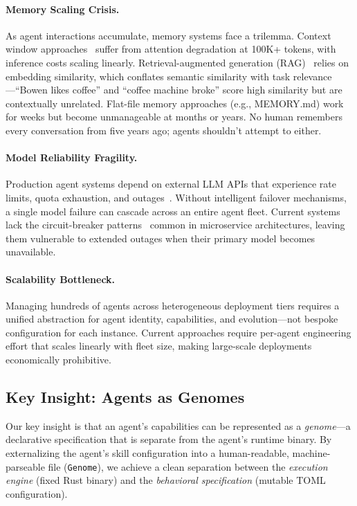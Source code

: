 \documentclass[conference]{IEEEtran}
\newcommand{\genome}{\texttt{Genome}\xspace}
\begin{document}
\paragraph{Memory Scaling Crisis.} As agent interactions accumulate, memory systems face a trilemma. Context window approaches~\cite{xiong2023memorizing} suffer from attention degradation at 100K+ tokens, with inference costs scaling linearly. Retrieval-augmented generation (RAG)~\cite{lewis2020retrieval} relies on embedding similarity, which conflates semantic similarity with task relevance—``Bowen likes coffee'' and ``coffee machine broke'' score high similarity but are contextually unrelated. Flat-file memory approaches (e.g., MEMORY.md) work for weeks but become unmanageable at months or years. No human remembers every conversation from five years ago; agents shouldn't attempt to either.

\paragraph{Model Reliability Fragility.} Production agent systems depend on external LLM APIs that experience rate limits, quota exhaustion, and outages~\cite{tan2020head}. Without intelligent failover mechanisms, a single model failure can cascade across an entire agent fleet. Current systems lack the circuit-breaker patterns~\cite{ford2000circuit} common in microservice architectures, leaving them vulnerable to extended outages when their primary model becomes unavailable.

\paragraph{Scalability Bottleneck.} Managing hundreds of agents across heterogeneous deployment tiers requires a unified abstraction for agent identity, capabilities, and evolution—not bespoke configuration for each instance. Current approaches require per-agent engineering effort that scales linearly with fleet size, making large-scale deployments economically prohibitive.

\subsection{Key Insight: Agents as Genomes}

Our key insight is that an agent's capabilities can be represented as a \textit{genome}—a declarative specification that is separate from the agent's runtime binary. By externalizing the agent's skill configuration into a human-readable, machine-parseable file (\genome{}), we achieve a clean separation between the \textit{execution engine} (fixed Rust binary) and the \textit{behavioral specification} (mutable TOML configuration).
\end{document}
